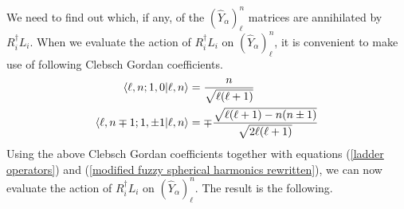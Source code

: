 %
%
We need to find out which, if any, of the $(\hat{Y}_\alpha)^n_{\ell}$ matrices are annihilated by $R_i^\dagger L_i$. When we evaluate the action of $R_i^\dagger L_i$ on $(\hat{Y}_\alpha)^n_{\ell}$, it is convenient to make use of following Clebsch Gordan coefficients.
%
%
\begin{align}
\braket{\ell,n;1,0}{\ell,n}
&=
\frac{n}{\sqrt{\ell (\ell + 1)}}
\\
\braket{\ell,n \mp 1;1,\pm 1}{\ell,n}
&=
\mp \frac{\sqrt{\ell (\ell + 1) - n (n \pm 1)}}{\sqrt{2 \ell (\ell + 1)}}
\end{align}
%
%
Using the above Clebsch Gordan coefficients together with equations (\ref{ladder operators}) and (\ref{modified fuzzy spherical harmonics rewritten}), we can now evaluate the action of $R_i^\dagger L_i$ on $(\hat{Y}_\alpha)^n_{\ell}$. The result is the following.

